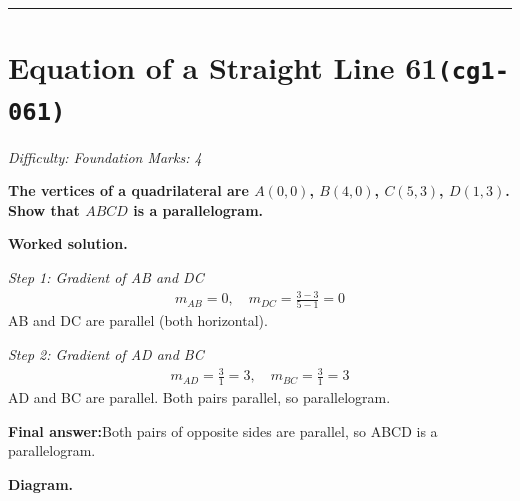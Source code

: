 \documentclass[11pt]{article}
\newcommand{\question}[1]{\par\medskip\noindent\textbf{#1}\par}
\begin{document}
\medskip\hrule

\section*{Equation of a Straight Line 61\quad\small\texttt{(cg1-061)}}
\textit{Difficulty: Foundation \quad\textbar\quad Marks: 4}

\question{The vertices of a quadrilateral are \( A(0,0) \), \( B(4,0) \), \( C(5,3) \), \( D(1,3) \). Show that \( ABCD \) is a parallelogram.}

\textbf{Worked solution.}

\textit{Step 1: Gradient of AB and DC}
\[\begin{gathered}
m_{AB} = 0, \quad m_{DC} = \frac{3-3}{5-1} = 0
\end{gathered}\]
AB and DC are parallel (both horizontal).

\textit{Step 2: Gradient of AD and BC}
\[\begin{gathered}
m_{AD} = \frac{3}{1} = 3, \quad m_{BC} = \frac{3}{1} = 3
\end{gathered}\]
AD and BC are parallel. Both pairs parallel, so parallelogram.

\begin{answerbox}
\textbf{Final answer:}\quad Both pairs of opposite sides are parallel, so ABCD is a parallelogram.
\end{answerbox}
\textbf{Diagram.}
\end{document}
